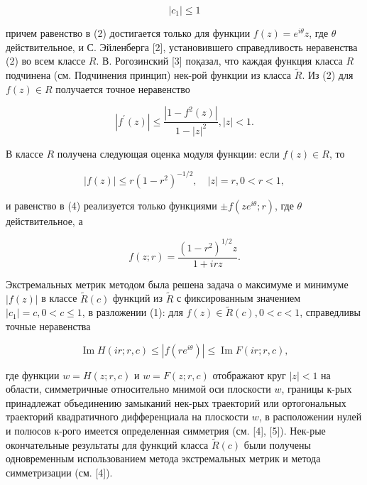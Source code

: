 \documentclass[10pt]{article}
\begin{document}
\[

\left|c_{1}\right| \leqslant 1

\]



причем равенство в (2) достигается только для функции $f(z)=e^{i \theta} z$, где $\theta$ действительное, и С. Эйленберга [2], установившего справедливость неравенства (2) во всем классе $R$. В. Рогозинский [3] поқазал, что каждая функция класса $R$ подчинена (см. Подчинения принцип) нек-рой функции из класса $\tilde{R}$. Из (2) для $f(z) \in R$ получается точное неравенство



\[

\left|f^{\prime}(z)\right| \leqslant \frac{\left|1-f^{2}(z)\right|}{1-|z|^{2}},|z|<1 .

\]



В классе $R$ получена следующая оценка модуля функции: если $f(z) \in R$, то



\[

|f(z)| \leqslant r\left(1-r^{2}\right)^{-1 / 2}, \quad|z|=r, 0<r<1,

\]



и равенство в (4) реализуется только функциями $\pm f\left(z e^{i \theta} ; r\right)$, где $\theta$ действительное, а



\[

f(z ; r)=\frac{\left(1-r^{2}\right)^{1 / 2} z}{1+i r z} .

\]



Экстремальных метрик методом была решена задача о максимуме и минимуме $|f(z)|$ в классе $\widetilde{R}(c)$ функций из $\tilde{R}$ с фиксированным значением $\left|c_{1}\right|=c, 0<c \leqslant 1$, в разложении (1): для $f(z) \in \tilde{R}(c), 0<c<1$, справедливы точные неравенства



\[

\operatorname{Im} H(i r ; r, c) \leqslant\left|f\left(r e^{i \theta}\right)\right| \leqslant \operatorname{Im} F(i r ; r, c),

\]



где функции $w=H(z ; r, c)$ и $w=F(z ; r, c)$ отображают круг $|z|<1$ на области, симметричные относительно мнимой оси плоскости $w$, границы к-рых принадлежат объединению замыканий нек-рых траекторий или ортогональных траекторий квадратичного дифференциала на плоскости $w$, в расположении нулей и полюсов к-рого имеется определенная симметрия (см. [4], [5]). Нек-рые окончательные результаты для функций класса $\widetilde{R}(c)$ были получены одновременным использованием метода экстремальных метрик и метода симметризации (см. [4]).
\end{document}
